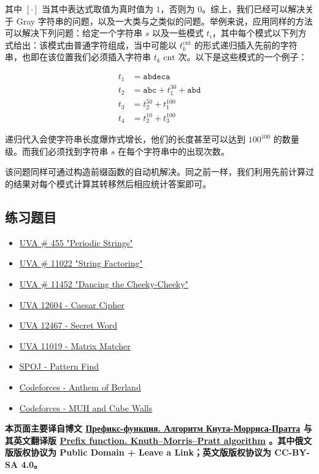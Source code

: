 其中 $[\cdot]$ 当其中表达式取值为真时值为 $1$，否则为 $0$。综上，我们已经可以解决关于 Gray 字符串的问题，以及一大类与之类似的问题。举例来说，应用同样的方法可以解决下列问题：给定一个字符串 $s$ 以及一些模式 $t_i$，其中每个模式以下列方式给出：该模式由普通字符组成，当中可能以 $t_{k}^{\text{cnt}}$ 的形式递归插入先前的字符串，也即在该位置我们必须插入字符串 $t_k$ $\text{cnt}$ 次。以下是这些模式的一个例子：

$$
\begin{align}
t_1 &= \mathtt{abdeca} \\
t_2 &= \mathtt{abc} + t_1^{30} + \mathtt{abd} \\
t_3 &= t_2^{50} + t_1^{100} \\
t_4 &= t_2^{10} + t_3^{100}
\end{align}
$$

递归代入会使字符串长度爆炸式增长，他们的长度甚至可以达到 $100^{100}$ 的数量级。而我们必须找到字符串 $s$ 在每个字符串中的出现次数。

该问题同样可通过构造前缀函数的自动机解决。同之前一样，我们利用先前计算过的结果对每个模式计算其转移然后相应统计答案即可。

\subsection{练习题目}

\begin{itemize}
\item \href{http://uva.onlinejudge.org/index.php?option=onlinejudge&page=show_problem&problem=396}{UVA \# 455 "Periodic Strings"}
\item \href{http://uva.onlinejudge.org/index.php?option=onlinejudge&page=show_problem&problem=1963}{UVA \# 11022 "String Factoring"}
\item \href{http://uva.onlinejudge.org/index.php?option=onlinejudge&page=show_problem&problem=2447}{UVA \# 11452 "Dancing the Cheeky-Cheeky"}
\item \href{https://uva.onlinejudge.org/index.php?option=com_onlinejudge&Itemid=8&page=show_problem&problem=4282}{UVA 12604 - Caesar Cipher}
\item \href{https://uva.onlinejudge.org/index.php?option=com_onlinejudge&Itemid=8&page=show_problem&problem=3911}{UVA 12467 - Secret Word}
\item \href{https://uva.onlinejudge.org/index.php?option=onlinejudge&page=show_problem&problem=1960}{UVA 11019 - Matrix Matcher}
\item \href{http://www.spoj.com/problems/NAJPF/}{SPOJ - Pattern Find}
\item \href{http://codeforces.com/contest/808/problem/G}{Codeforces - Anthem of Berland}
\item \href{http://codeforces.com/problemset/problem/471/D}{Codeforces - MUH and Cube Walls}
\end{itemize}

\hr

\textbf{本页面主要译自博文 \href{http://e-maxx.ru/algo/prefix_function}{Префикс-функция. Алгоритм Кнута-Морриса-Пратта} 与其英文翻译版 \href{https://cp-algorithms.com/string/prefix-function.html}{Prefix function. Knuth–Morris–Pratt algorithm} 。其中俄文版版权协议为 Public Domain + Leave a Link；英文版版权协议为 CC-BY-SA 4.0。}
